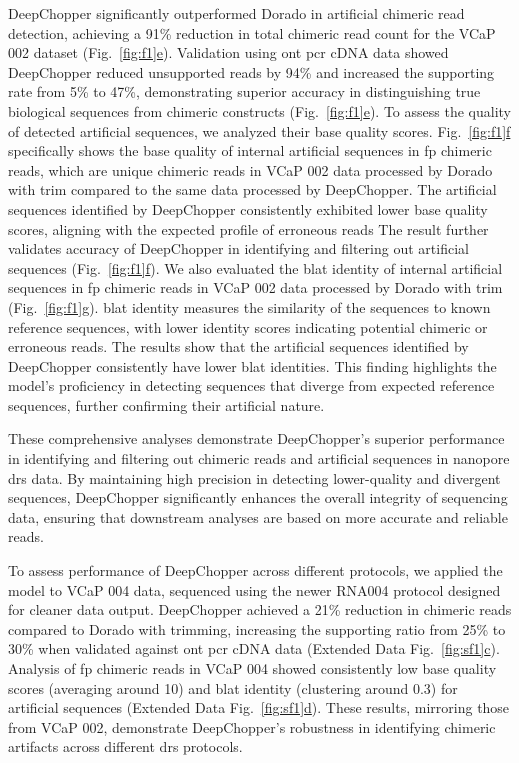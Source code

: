 \documentclass[pdflatex, sn-mathphys-num, lineno]{sn-jnl}%
\newcommand{\figref}[2]{Fig.~\hyperref[#1]{\ref*{#1}#2}}
\newcommand{\edfigref}[2]{Extended Data Fig.~\hyperref[#1]{\ref*{#1}#2}}
\theoremstyle{thmstyleone}%
\theoremstyle{thmstyletwo}%
\theoremstyle{thmstylethree}%
\begin{document}
DeepChopper significantly outperformed Dorado in artificial chimeric read detection, achieving a 91\% reduction in total chimeric read count for the VCaP 002 dataset (\figref{fig:f1}{e}).
Validation using \gls{ont} \gls{pcr} cDNA data showed DeepChopper reduced unsupported reads by 94\% and increased the supporting rate from 5\% to 47\%, demonstrating superior accuracy in distinguishing true biological sequences from chimeric constructs (\figref{fig:f1}{e}).
To assess the quality of detected artificial sequences, we analyzed their base quality scores. \figref{fig:f1}{f} specifically shows the base quality of internal artificial sequences in \gls{fp} chimeric reads, which are unique chimeric reads in VCaP 002 data processed by Dorado with trim compared to the same data processed by DeepChopper.
The artificial sequences identified by DeepChopper consistently exhibited lower base quality scores, aligning with the expected profile of erroneous reads
The result further validates accuracy of DeepChopper in identifying and filtering out artificial sequences (\figref{fig:f1}{f}).
We also evaluated the \gls{blat} identity of internal artificial sequences in \gls{fp} chimeric reads in VCaP 002 data processed by Dorado with trim  (\figref{fig:f1}{g}).
\gls{blat} identity measures the similarity of the sequences to known reference sequences, with lower identity scores indicating potential chimeric or erroneous reads.
The results show that the artificial sequences identified by DeepChopper consistently have lower \gls{blat} identities.
This finding highlights the model's proficiency in detecting sequences that diverge from expected reference sequences, further confirming their artificial nature.

These comprehensive analyses demonstrate DeepChopper's superior performance in identifying and filtering out chimeric reads and artificial sequences in nanopore \gls{drs} data.
By maintaining high precision in detecting lower-quality and divergent sequences, DeepChopper significantly enhances the overall integrity of sequencing data, ensuring that downstream analyses are based on more accurate and reliable reads.

To assess performance of DeepChopper across different protocols, we applied the model to VCaP 004 data, sequenced using the newer RNA004 protocol designed for cleaner data output.
DeepChopper achieved a 21\% reduction in chimeric reads compared to Dorado with trimming, increasing the supporting ratio from 25\% to 30\% when validated against \gls{ont} \gls{pcr} cDNA data (\edfigref{fig:sf1}{c}).
Analysis of \gls{fp} chimeric reads in VCaP 004 showed consistently low base quality scores (averaging around 10) and \gls{blat} identity (clustering around 0.3) for artificial sequences (\edfigref{fig:sf1}{d}).
These results, mirroring those from VCaP 002, demonstrate DeepChopper's robustness in identifying chimeric artifacts across different \gls{drs} protocols.
\end{document}
